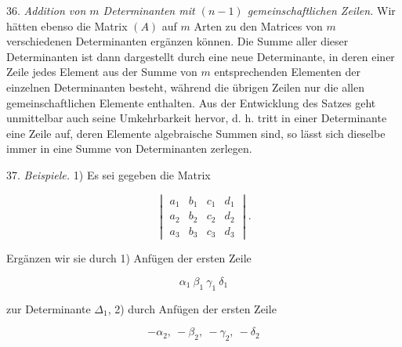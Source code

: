 36. \textit{Addition von $m$ Determinanten mit $(n-1)$ gemeinschaftlichen
Zeilen.} Wir hätten ebenso die Matrix $(A)$ auf $m$ Arten zu den
Matrices von $m$ verschiedenen Determinanten ergänzen können. Die Summe
aller dieser Determinanten ist dann dargestellt durch eine neue
Determinante, in deren einer Zeile jedes Element aus der Summe von $m$
entsprechenden Elementen der einzelnen Determinanten besteht, während
die übrigen Zeilen nur die allen gemeinschaftlichen Elemente enthalten.
Aus der Entwicklung des Satzes geht unmittelbar auch seine
Umkehrbarkeit hervor, d. h. tritt in einer Determinante eine Zeile auf,
deren Elemente algebraische Summen sind, so lässt sich dieselbe immer
in eine Summe von Determinanten zerlegen.

37. \textit{Beispiele.} 1) Es sei gegeben die Matrix

\[
\begin{vmatrix}
a_1 & b_1 & c_1 & d_1 \\
a_2 & b_2 & c_2 & d_2 \\
a_3 & b_3 & c_3 & d_3
\end{vmatrix}.
\]

Ergänzen wir sie durch 1) Anfügen der ersten Zeile

\[
\alpha_1\ \beta_1\ \gamma_1\ \delta_1
\]

zur Determinante $\Delta_1$, 2) durch Anfügen der ersten Zeile

\[
-\alpha_2,\ -\beta_2,\ -\gamma_2,\ -\delta_2
\]


